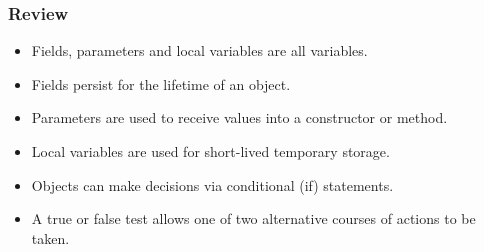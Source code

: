 \documentclass{beamer}
\begin{document}
\begin{frame}
\frametitle{Review}
\begin{itemize}
\item Fields, parameters and local variables are all variables.
\item Fields persist for the lifetime of an object.
\item Parameters are used to receive values into a constructor or method.
\item Local variables are used for short-lived temporary storage. 
\item Objects can make decisions via conditional (if) statements.
\item A true or false test allows one of two alternative courses of actions to be taken.
\end{itemize}
\end{frame}
\end{document}
